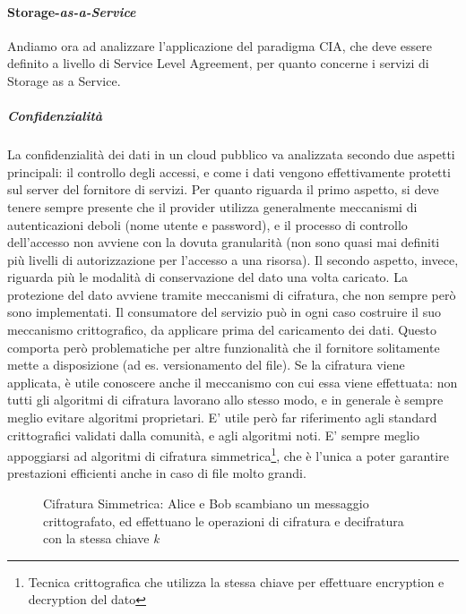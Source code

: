 \paragraph{Storage-\textit{as-a-Service}}
Andiamo ora ad analizzare l'applicazione del paradigma CIA, che deve essere definito a livello di Service Level Agreement, per quanto concerne i servizi di Storage as a Service.
\subparagraph{Confidenzialità}
La confidenzialità dei dati in un cloud pubblico va analizzata secondo due aspetti principali: il controllo degli accessi, e come i dati vengono effettivamente protetti sul server del fornitore di servizi.
Per quanto riguarda il primo aspetto, si deve tenere sempre presente che il provider utilizza generalmente meccanismi di autenticazioni deboli (nome utente e password), e il processo di controllo dell'accesso non avviene con la dovuta granularità (non sono quasi mai definiti più livelli di autorizzazione per l'accesso a una risorsa).
Il secondo aspetto, invece, riguarda più le modalità di conservazione del dato una volta caricato. La protezione del dato avviene tramite meccanismi di cifratura, che non sempre però sono implementati.
Il consumatore del servizio può in ogni caso costruire il suo meccanismo crittografico, da applicare prima del caricamento dei dati. Questo comporta però problematiche per altre funzionalità che il fornitore solitamente mette a disposizione (ad es. versionamento del file).\cite{CloudSecurityBook}
Se la cifratura viene applicata, è utile conoscere anche il meccanismo con cui essa viene effettuata: non tutti gli algoritmi di cifratura lavorano allo stesso modo, e in generale è sempre meglio evitare algoritmi proprietari.\cite{CloudSecurityBook}
E' utile però far riferimento agli standard crittografici validati dalla comunità, e agli algoritmi noti.
E' sempre meglio appoggiarsi ad algoritmi di cifratura simmetrica\footnote{Tecnica crittografica che utilizza la stessa chiave per effettuare encryption e decryption del dato}, che è l'unica a poter garantire prestazioni efficienti anche in caso di file molto grandi.
\begin{figure}[H]
\centering
{}
\caption{Cifratura Simmetrica: Alice e Bob scambiano un messaggio crittografato, ed effettuano le operazioni di cifratura e decifratura con la stessa chiave \textit{k}}\label{fig:cifraturasimmetrica}
\end{figure}

